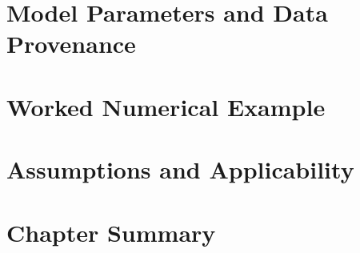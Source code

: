 \section{Model Parameters and Data Provenance}
\label{sec:model-parameters}

%

\section{Worked Numerical Example}
\label{sec:worked-example}


\section{Assumptions and Applicability}
\label{sec:model-assumptions}

%

\section{Chapter Summary}
\label{sec:model-summary}

